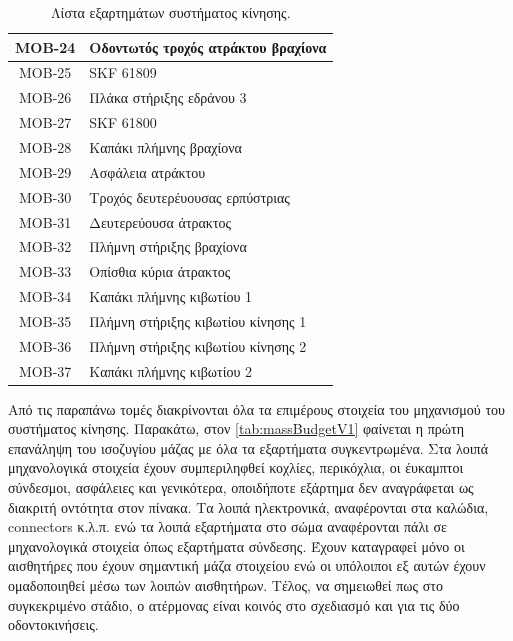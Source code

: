 \begin{table}[H]
\begin{tabular}{|c|l|}
\hline
MOB-24 & Οδοντωτός τροχός ατράκτου βραχίονα\\
\hline
MOB-25 & SKF 61809\\
\hline
MOB-26 & Πλάκα στήριξης εδράνου 3\\
\hline
MOB-27 & SKF 61800\\
\hline
MOB-28 & Καπάκι πλήμνης βραχίονα\\
\hline
MOB-29 & Ασφάλεια ατράκτου\\
\hline
MOB-30 & Τροχός δευτερέυουσας ερπύστριας\\
\hline
MOB-31 & Δευτερεύουσα άτρακτος\\
\hline
MOB-32 & Πλήμνη στήριξης βραχίονα\\
\hline
MOB-33 & Οπίσθια κύρια άτρακτος\\
\hline
MOB-34 & Καπάκι πλήμνης κιβωτίου 1\\
\hline
MOB-35 & Πλήμνη στήριξης κιβωτίου κίνησης 1\\
\hline
MOB-36 & Πλήμνη στήριξης κιβωτίου κίνησης 2\\
\hline
MOB-37 & Καπάκι πλήμνης κιβωτίου 2\\
\hline
        \end{tabular}
    \caption{Λίστα εξαρτημάτων συστήματος κίνησης.}
    \label{tab:bom}
\end{table}











Από τις παραπάνω τομές διακρίνονται όλα τα επιμέρους στοιχεία του μηχανισμού του συστήματος κίνησης. Παρακάτω, στον \ref{tab:massBudgetV1} φαίνεται η πρώτη επανάληψη του ισοζυγίου μάζας με όλα τα εξαρτήματα συγκεντρωμένα. Στα λοιπά μηχανολογικά στοιχεία έχουν συμπεριληφθεί κοχλίες, περικόχλια, οι έυκαμπτοι σύνδεσμοι, ασφάλειες και γενικότερα, οποιδήποτε εξάρτημα δεν αναγράφεται ως διακριτή οντότητα στον πίνακα. Τα λοιπά ηλεκτρονικά, αναφέρονται στα καλώδια, connectors κ.λ.π. ενώ τα λοιπά εξαρτήματα στο σώμα αναφέρονται πάλι σε μηχανολογικά στοιχεία όπως εξαρτήματα σύνδεσης. Έχουν καταγραφεί μόνο οι αισθητήρες που έχουν σημαντική μάζα στοιχείου ενώ οι υπόλοιποι εξ αυτών έχουν ομαδοποιηθεί μέσω των λοιπών αισθητήρων. Τέλος, να σημειωθεί πως στο συγκεκριμένο στάδιο, ο ατέρμονας είναι κοινός στο σχεδιασμό και για τις δύο οδοντοκινήσεις.

